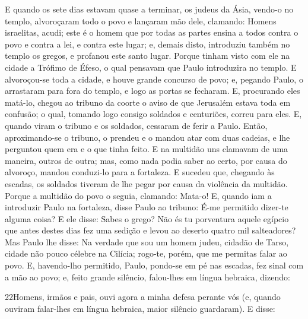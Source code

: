 E quando os sete dias estavam quase a terminar, os judeus da
Ásia, vendo-o no templo, alvoroçaram todo o povo e lançaram mão
dele, clamando: Homens israelitas, acudi; este é o homem que
por todas as partes ensina a todos contra o povo e contra a lei, e
contra este lugar; e, demais disto, introduziu também no templo os
gregos, e profanou este santo lugar. Porque tinham visto com
ele na cidade a Trófimo de Éfeso, o qual pensavam que Paulo
introduzira no templo. E alvoroçou-se toda a cidade, e houve
grande concurso de povo; e, pegando Paulo, o arrastaram para fora do
templo, e logo as portas se fecharam. E, procurando eles
matá-lo, chegou ao tribuno da coorte o aviso de que Jerusalém estava
toda em confusão; o qual, tomando logo consigo soldados e
centuriões, correu para eles. E, quando viram o tribuno e os
soldados, cessaram de ferir a Paulo. Então, aproximando-se o
tribuno, o prendeu e o mandou atar com duas cadeias, e lhe perguntou
quem era e o que tinha feito. E na multidão uns clamavam de
uma maneira, outros de outra; mas, como nada podia saber ao certo,
por causa do alvoroço, mandou conduzi-lo para a fortaleza. E
sucedeu que, chegando às escadas, os soldados tiveram de lhe pegar
por causa da violência da multidão. Porque a multidão do povo
o seguia, clamando: Mata-o! E, quando iam a introduzir Paulo
na fortaleza, disse Paulo ao tribuno: É-me permitido dizer-te alguma
coisa? E ele disse: Sabes o grego? Não és tu porventura
aquele egípcio que antes destes dias fez uma sedição e levou ao
deserto quatro mil salteadores? Mas Paulo lhe disse: Na
verdade que sou um homem judeu, cidadão de Tarso, cidade não pouco
célebre na Cilícia; rogo-te, porém, que me permitas falar ao povo.
E, havendo-lho permitido, Paulo, pondo-se em pé nas escadas,
fez sinal com a mão ao povo; e, feito grande silêncio, falou-lhes em
língua hebraica, dizendo:

\medskip

\lettrine{22} Homens, irmãos e pais, ouvi agora a minha defesa
perante vós (e, quando ouviram falar-lhes em língua hebraica,
maior silêncio guardaram). E disse:

